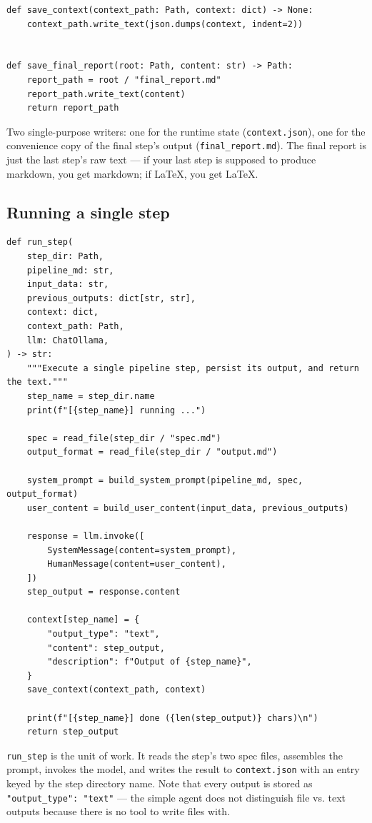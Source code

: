 \documentclass[12pt, a4paper]{article}
\begin{document}
\begin{lstlisting}[style=pythonstyle]
def save_context(context_path: Path, context: dict) -> None:
    context_path.write_text(json.dumps(context, indent=2))


def save_final_report(root: Path, content: str) -> Path:
    report_path = root / "final_report.md"
    report_path.write_text(content)
    return report_path
\end{lstlisting}

Two single-purpose writers: one for the runtime state (\texttt{context.json}), one for the convenience copy of the final step's output (\texttt{final\_report.md}). The final report is just the last step's raw text — if your last step is supposed to produce markdown, you get markdown; if \LaTeX, you get \LaTeX.

\subsection{Running a single step}

\begin{lstlisting}[style=pythonstyle]
def run_step(
    step_dir: Path,
    pipeline_md: str,
    input_data: str,
    previous_outputs: dict[str, str],
    context: dict,
    context_path: Path,
    llm: ChatOllama,
) -> str:
    """Execute a single pipeline step, persist its output, and return the text."""
    step_name = step_dir.name
    print(f"[{step_name}] running ...")

    spec = read_file(step_dir / "spec.md")
    output_format = read_file(step_dir / "output.md")

    system_prompt = build_system_prompt(pipeline_md, spec, output_format)
    user_content = build_user_content(input_data, previous_outputs)

    response = llm.invoke([
        SystemMessage(content=system_prompt),
        HumanMessage(content=user_content),
    ])
    step_output = response.content

    context[step_name] = {
        "output_type": "text",
        "content": step_output,
        "description": f"Output of {step_name}",
    }
    save_context(context_path, context)

    print(f"[{step_name}] done ({len(step_output)} chars)\n")
    return step_output
\end{lstlisting}

\texttt{run\_step} is the unit of work. It reads the step's two spec files, assembles the prompt, invokes the model, and writes the result to \texttt{context.json} with an entry keyed by the step directory name. Note that every output is stored as \texttt{"output\_type": "text"} — the simple agent does not distinguish file vs. text outputs because there is no tool to write files with.
\end{document}
